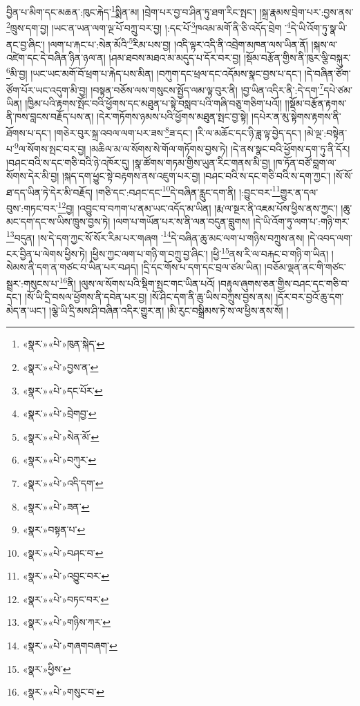 བྱིན་པ་མིག་དང་མཆན་:ཁུང་རྐེད་\footnote{«སྣར་»«པེ་»ཁུན་སྐེད་}སྨིན་མ། །བྲེག་པར་བྱ་བ་ཤིན་ཏུ་ཐག་རིང་སྤང་། །སྐྲ་རྣམས་བྲེག་པར་:བྱས་ནས་\footnote{«སྣར་»«པེ་»བྱས་ན་}ཁྲུས་དག་བྱ། །ཡང་ན་ཡན་ལག་ལྔ་པོ་བཀྲུ་བར་བྱ། །:དང་པོ་\footnote{«སྣར་»«པེ་»དང་པོར་}ཁའམ་མགོ་ནི་ཅི་འདོད་བྲེག ་\footnote{«སྣར་»«པེ་»བྲེགབྱ་}དེ་ཡི་འོག་ཏུ་སྣ་ཡི་ནང་བྱ་ཞིང་། །ལག་པ་རྐང་པ་:སེན་མོའི་\footnote{«སྣར་»«པེ་»སེན་མོ་}རིམ་པས་བྱ། །འདི་ལྟར་འདི་ནི་འབྲེག་མཁན་ལས་ཡིན་ནོ། །སྐས་ལ་འཛེག་དང་དེ་བཞིན་ཉིན་ཉལ་ན། །ཤམ་ཐབས་མཐའ་མ་མདུད་པ་དོར་བར་བྱ། །སྡོམ་བརྩོན་གྱིས་ནི་ཁུར་ལྕི་བསྐུར་\footnote{«སྣར་»«པེ་»བཀུར་}མི་བྱ། །ཡང་ཡང་མགོ་བོ་ཕྲག་པ་རྐེད་པས་མིན། །བཀུག་དང་ཕྲལ་དང་འདོམས་སྣང་བྱས་པ་དང་། །དེ་བཞིན་ཙོག་ཙོག་པོར་ཡང་འདུག་མི་བྱ། །བསྟན་བཅོས་ལས་གསུངས་སྤྱོད་ལམ་ལྟ་བུར་ནི། །བྱ་ཡིན་འདིར་ནི་:དེ་དག་\footnote{«སྣར་»«པེ་»འདི་དག་}དཔེ་ཙམ་ཡིན། །ཁྱིམ་པའི་རྟགས་སྤོང་བའི་ཕྱོགས་དང་མཐུན་པ་སྟེ་བསླབ་པའི་གཞི་བཅུ་གཅིག་པའོ།། །།སྡོམ་བརྩོན་རྟགས་ནི་ཁས་བླངས་བརྗོད་པས་ན། །དེར་གཏོགས་ཉམས་པའི་ཕྱོགས་མཐུན་སྤང་བྱ་སྟེ། །དཔེར་ན་མུ་སྟེགས་རྟགས་ནི་ཐོགས་པ་དང་། །གཅེར་བུར་སྐྲ་འབལ་ལག་པར་ཟས་\footnote{«སྣར་»«པེ་»ཟན་}ཟ་དང་། །རི་ལ་མཆོང་དང་ཉི་ཟླ་ལྟ་བྱེད་དང་། །མེ་ལྔ་:བསྟེན་པ་\footnote{«སྣར་»བསྟན་པ་}ལ་སོགས་སྤང་བར་བྱ། །མཆིལ་མ་ལ་སོགས་སེ་གོལ་གཏོགས་བྱས་ཏེ། །དེ་ནས་སྣང་བའི་ཕྱོགས་དག་ཏུ་ནི་དོར། །བཤང་བའི་ས་དང་གཅི་བའི་ཉེ་འཁོར་དུ། །སྣ་ཚོགས་གཏམ་གྱིས་ཡུན་རིང་གནས་མི་བྱ། །ཁ་ཏོན་བཙོ་བླག་ལ་སོགས་དེར་མི་བྱ། །སྐད་དག་ཕྱུང་སྟེ་བརྟགས་ནས་འཇུག་པར་བྱ། །བཤང་བའི་ས་དང་གཅི་བའི་ས་དག་ཀྱང་། །སོ་སོ་ཐ་དད་ཡིན་ཏེ་དེར་མི་བརྗོད། །གཅི་དང་:བཤང་དང་\footnote{«སྣར་»«པེ་»བཤང་བ་}དེ་བཞིན་རླུང་དག་ནི། །:བྱུང་བར་\footnote{«སྣར་»«པེ་»འབྱུང་བར་}གྱུར་ན་དལ་བུས་:གཏང་བར་\footnote{«སྣར་»«པེ་»བཏང་བར་}བྱ། །འབྱུང་བ་བཀག་པ་ནམ་ཡང་འདོད་མ་ཡིན། །རྨ་ལ་སྔར་ནི་འཇམ་པོས་ཕྱིས་ནས་ཀྱང་། །ཆུ་མང་དག་དང་ས་ཡིས་ཁྲུས་བྱས་ཏེ། །ལག་པ་གཡོན་པར་ས་ནི་ལན་བདུན་བླུགས། །དེ་ཡི་འོག་ཏུ་ལག་པ་:གཉི་གར་\footnote{«སྣར་»«པེ་»གཉིས་ཀར་}བདུན། །ས་དེ་དག་ཀྱང་སོ་སོར་རིམ་པར་གཞག ་\footnote{«སྣར་»«པེ་»གཞགབཞག་}དེ་བཞིན་ཆུ་མང་ལག་པ་གཉིས་བཀྲུས་ནས། །དེ་འབད་ལག་ངར་བྱིན་པ་ལེགས་ཕྱིས་ཏེ། །ཕྱིས་ཀྱང་ལག་པ་གཉི་ག་བཀྲུ་བྱ་ཞིང་། །ཕྱི་\footnote{«སྣར་»ཕྱིས་}ནས་རི་ལ་བརྐང་བ་གཉི་ག་ཡིན། །སེམས་ནི་དག་ན་གཙང་བ་ཡིན་པར་བཤད། །དྲི་དང་གོས་པ་དག་དང་བྲལ་ཙམ་ཡིན། །བཅོམ་ལྡན་ནང་གི་གཙང་སྦྲར་:གསུངས་པ་\footnote{«སྣར་»«པེ་»གསུང་བ་}ནི། །ལུས་ལ་སོགས་པའི་སྡིག་སྤང་གང་ཡིན་པའོ། །བརྟུལ་ཞུགས་ཅན་གྱིས་བཤང་དང་གཅི་བ་དང་། །སོ་ཡི་དྲི་བསལ་ཕྱོགས་ནི་དབེན་པར་བྱ། །སོ་ཤིང་དག་ནི་ཆུ་ཡིས་བཀྲུས་བྱས་ནས། །དོར་བར་བྱའོ་ཆུ་དག་མེད་ན་ཡང་། །ལྕེ་ཡི་དྲི་མས་ཤི་བཞིན་འདིར་གྱུར་ན། །མི་རུང་བསྒྲིམས་ཏེ་ས་ལ་ཕྱིས་ནས་སོ། །

